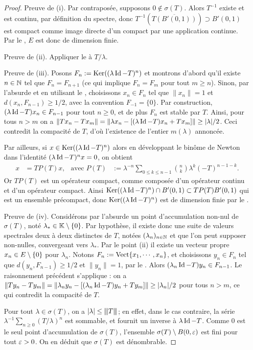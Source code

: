 \begin{proof}
	Preuve de (i). Par contraposée, supposons $0 \notin \sigma(T)$. Alors $T^{-1}$ existe et est continu, par définition du spectre, donc $T^{-1}(\overline {T(B'(0,1))}) \supset B'(0,1)$ est compact comme image directe d'un compact par une application continue. Par le , $E$ est donc de dimension finie.

	Preuve de (ii). Appliquer le  à $T/\lambda$.
	
	Preuve de (iii). 
	Posons $F_n := \operatorname{Ker}((\lambda\operatorname{Id}-T)^n)$ et montrons d'abord qu'il existe $n\in \mathbb{N}$ tel que $F_n = F_{n+1}$ (ce qui implique $F_n = F_m$ pour tout $m \geq n$).
	Sinon, par l'absurde et en utilisant le , choisissons $x_n \in F_n$ tel que $\|x_n\| = 1$ et $d(x_n,F_{n-1}) \geq 1/2$, avec la convention $F_{-1} = \{0\}$.
	Par construction, $(\lambda \operatorname{Id}-T) x_n \in F_{n-1}$ pour tout $n \geq 0$, et de plus $F_n$ est stable par $T$. 
	Ainsi, pour tous $n>m$ on a $\|T x_n - T x_m\| = 
	\|\lambda x_n - [(\lambda \operatorname{Id}-T)x_n + T x_m]\| \geq |\lambda|/2$.
	Ceci contredit la compacité de $T$, d'où l'existence de l'entier $m(\lambda)$ annoncée.
	
	Par ailleurs, si $x \in \operatorname{Ker}( (\lambda\operatorname{Id}-T)^n)$ alors en développant le binôme de Newton dans l'identité $(\lambda\operatorname{Id} - T)^n x = 0$, on obtient
	\begin{align*}
		x &= T P(T) x, & 
		\text{avec }
		P(T) &:= \lambda^{-n} \sum_{0 \leq k\leq n-1} {\textstyle \binom n k} \lambda^k (-T)^{n-1-k}.
	\end{align*}
	 Or $T P(T)$ est un opérateur compact, comme composée d'un opérateur continu et d'un opérateur compact. Ainsi $\operatorname{Ker}( (\lambda\operatorname{Id}-T)^n) \cap B'(0,1) \subset T P(T) B'(0,1)$ qui est un ensemble précompact, donc $\operatorname{Ker}( (\lambda\operatorname{Id}-T)^n)$ est de dimension finie par le .
	
	Preuve de (iv).
	Considérons par l'absurde un point d'accumulation non-nul de $\sigma(T)$, noté $\lambda_* \in \mathbb{K}\setminus \{0\}$. Par hypothèse, il existe donc une suite de valeurs spectrales deux à deux distinctes de $T$, notées $(\lambda_n)_{n \in \mathbb{N}}$ et que l'on peut supposer non-nulles, convergeant vers $\lambda_*$.
	Par le point (ii) il existe un vecteur propre $x_n \in E\setminus \{0\}$ pour $\lambda_n$. Notons $F_n := \operatorname{Vect}\{x_1,\cdots,x_n\}$, et choisissons $y_n\in F_n$ tel que $d(y_n,F_{n-1}) \geq 1/2$ et $\|y_n\|=1$, par le . 
	Alors $(\lambda_n \operatorname{Id}-T) y_n  \in F_{n-1}$. Le raisonnement précédent s'applique : on a 
	$\|T y_n - T y_m\| = 
	\| \lambda_n y_n - [(\lambda_n \operatorname{Id} - T) y_n + T y_m]\| \geq |\lambda_n|/2$ pour tous $n>m$, ce qui contredit la compacité de $T$. 
	
	Pour tout $\lambda \in \sigma(T)$, on a $|\lambda| \leq {\left\vert\kern-0.25ex\left\vert\kern-0.25ex\left\vert T \right\vert\kern-0.25ex\right\vert\kern-0.25ex\right\vert}$; en effet, dans le cas contraire, la série $\lambda^{-1} \sum_{n \geq 0} (T/\lambda)^n$ est sommable, et fournit un inverse à $\lambda \operatorname{Id} - T$. 
	Comme $0$ est le seul point d'accumu\-lation de $\sigma(T)$, l'ensemble $\sigma(T) \setminus B(0,\varepsilon)$ est fini pour tout $\varepsilon>0$. On en déduit que $\sigma(T)$ est dénombrable.
\end{proof}

